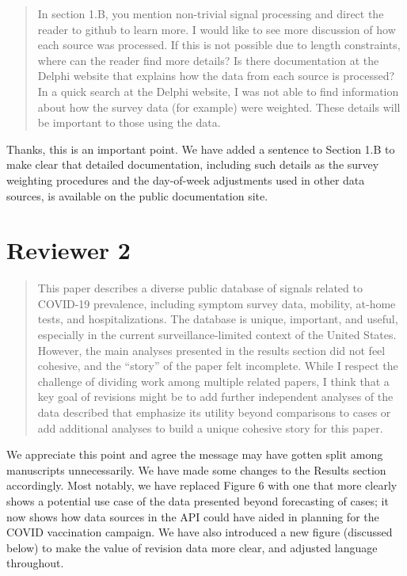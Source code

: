 \documentclass[11pt]{article}
\begin{document}
\begin{quote}
  In section 1.B, you mention non-trivial signal processing and direct the
  reader to github to learn more. I would like to see more discussion of how
  each source was processed. If this is not possible due to length constraints,
  where can the reader find more details? Is there documentation at the Delphi
  website that explains how the data from each source is processed? In a quick
  search at the Delphi website, I was not able to find information about how the
  survey data (for example) were weighted. These details will be important to
  those using the data.
\end{quote}
Thanks, this is an important point. We have added a sentence to Section 1.B to
make clear that detailed documentation, including such details as the survey
weighting procedures and the day-of-week adjustments used in other data sources,
is available on the public documentation site.

\section*{Reviewer 2}

\begin{quote}
  This paper describes a diverse public database of signals related to COVID-19
  prevalence, including symptom survey data, mobility, at-home tests, and
  hospitalizations. The database is unique, important, and useful, especially in
  the current surveillance-limited context of the United States. However, the
  main analyses presented in the results section did not feel cohesive, and the
  ``story'' of the paper felt incomplete. While I respect the challenge of
  dividing work among multiple related papers, I think that a key goal of
  revisions might be to add further independent analyses of the data described
  that emphasize its utility beyond comparisons to cases or add additional
  analyses to build a unique cohesive story for this paper.
\end{quote}
We appreciate this point and agree the message may have gotten split among
manuscripts unnecessarily. We have made some changes to the Results section
accordingly. Most notably, we have replaced Figure 6 with one that more clearly
shows a potential use case of the data presented beyond forecasting of cases; it
now shows how data sources in the API could have aided in planning for the COVID
vaccination campaign. We have also introduced a new figure (discussed below) to
make the value of revision data more clear, and adjusted language throughout.
\end{document}
